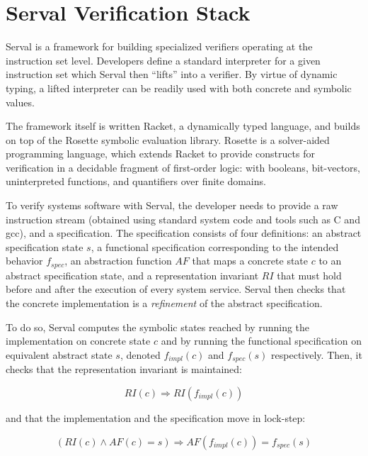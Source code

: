\documentclass[11pt,a4paper,runningheads]{llncs}
\newcommand{\serval}{Serval\xspace}
\newcommand{\racket}{\textsf{Racket}\xspace}
\newcommand{\rosette}{\textsf{Rosette}\xspace}
\newcommand{\clang}{\textsf{C}\xspace}
\newcommand{\gcc}{\textsf{gcc}\xspace}
\begin{document}
\section{\serval Verification Stack} 
\label{serval}

\serval is a framework for building specialized verifiers operating at the
instruction set level. Developers define a standard interpreter for a given
instruction set which \serval then ``lifts'' into a verifier. By virtue of
dynamic typing, a lifted interpreter can be readily used with both concrete and
symbolic values.

The framework itself is written \racket{}, a dynamically
typed language, and builds on top of the \rosette{} symbolic evaluation library.
%
\rosette{} is a solver-aided programming language, which extends Racket to provide
constructs for verification in a decidable fragment of first-order logic: with
booleans, bit-vectors, uninterpreted functions, and quantifiers over finite
domains.
%


To verify systems software with \serval, the developer needs to provide a raw
instruction stream (obtained using standard system code and tools such as \clang{} and
\gcc), and a specification.
%
The specification consists of four definitions: an abstract specification state $s$, a functional
specification corresponding to the intended behavior $f_{spec}$, an abstraction
function $AF$ that maps a concrete state $c$ to an abstract specification state, and a
representation invariant $RI$ that must hold before and after the execution of every system service.
\serval then checks that the concrete implementation is a \textit{refinement} of
the abstract specification.

To do so, \serval computes the symbolic states reached by running the
implementation on concrete state $c$ and by running the functional specification
on equivalent abstract state $s$, denoted $f_{impl}(c)$ and $f_{spec}(s)$
respectively. Then, it checks that the representation invariant is maintained:

$$
RI(c) \Rightarrow RI(f_{impl}(c))
$$

and that the implementation and the specification move in lock-step:

$$
 (RI(c) \land AF(c) = s) \Rightarrow AF(f_{impl}(c)) = f_{spec}(s)
$$


\end{document}
